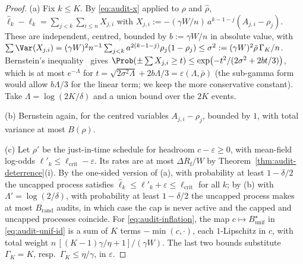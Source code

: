 \begin{proof}
(a) Fix $k\le K$. By \eqref{eq:audit-x} applied to $\rho$ and $\hat\rho$,
$\hat\ell_k-\ell_k=\sum_{j<k}\sum_{i\le n}X_{j,i}$ with
$X_{j,i}:=-(\gamma W/n)\,a^{k-1-j}(A_{j,i}-\rho_j)$. These are independent,
centred, bounded by $b:=\gamma W/n$ in absolute value, with
$\sum\Var(X_{j,i})=(\gamma W)^2n^{-1}\sum_{j<k}a^{2(k-1-j)}\rho_j(1-\rho_j)
\le\sigma^2:=(\gamma W)^2\bar\rho\,\Gamma_K/n$. Bernstein's
inequality~\cite{boucheron2013concentration} gives
$\Prob(\pm\sum X_{j,i}\ge t)\le\exp\bigl(-t^2/(2\sigma^2+2bt/3)\bigr)$, which is at most
$e^{-\Lambda}$ for $t=\sqrt{2\sigma^2\Lambda}+2b\Lambda/3=\varepsilon(\Lambda,\bar\rho)$ (the sub-gamma form would allow $b\Lambda/3$ for the linear term; we keep the more conservative constant).
Take $\Lambda=\log(2K/\delta)$ and a union bound over the $2K$ events.

(b) Bernstein again, for the centred variables $A_{j,i}-\rho_j$, bounded by $1$,
with total variance at most $B(\rho)$.

(c) Let $\rho'$ be the just-in-time schedule for headroom $c-\varepsilon\ge0$,
with mean-field log-odds $\ell'_k\le\ell_{\mathrm{crit}}-\varepsilon$. Its rates
are at most $\Delta R_{\mathrm f}/W$ by Theorem~\ref{thm:audit-deterrence}(i). By the
one-sided version of (a), with probability at least $1-\delta/2$ the uncapped
process satisfies $\hat\ell_k\le\ell'_k+\varepsilon\le\ell_{\mathrm{crit}}$ for
all $k$; by (b) with $\Lambda'=\log(2/\delta)$, with probability at least
$1-\delta/2$ the uncapped process makes at most $B_{\mathrm{rand}}$ audits, in
which case the cap is never active and the capped and uncapped processes
coincide. For \eqref{eq:audit-inflation}, the map
$c\mapsto B^\star_{\mathrm{unif}}$ in \eqref{eq:audit-unif-id} is a sum of
$K$ terms $-\min(c,\cdot)$, each $1$-Lipschitz in $c$, with total weight
$n\,[(K-1)\gamma/\eta+1]/(\gamma W)$. The last two bounds substitute
$\Gamma_K=K$, resp.\ $\Gamma_K\le\eta/\gamma$, in $\varepsilon$.
\end{proof}

